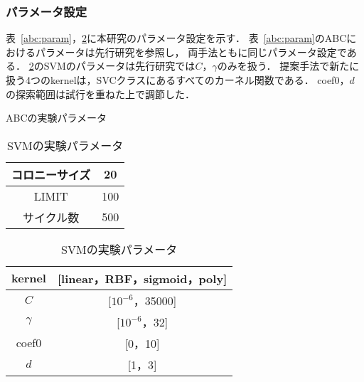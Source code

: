 \subsubsection{パラメータ設定}
表~\ref{abc:param}，\ref{svm:param}に本研究のパラメータ設定を示す．
表~\ref{abc:param}のABCにおけるパラメータは先行研究を参照し，
両手法ともに同じパラメータ設定である\cite{origin}．
\ref{svm:param}のSVMのパラメータは先行研究では$C$，$\gamma$のみを扱う．
提案手法で新たに扱う4つのkernelは，SVCクラスにあるすべてのカーネル関数である．
coef0，$d$の探索範囲は試行を重ねた上で調節した．
\begin{table}[tb]
    \centering
    \begin{minipage}{0.45\textwidth}  %
      \centering
      \caption{ABCの実験パラメータ}  %
      \begin{tabular}{|c|c|}  %
        \hline  %
        コロニーサイズ & 20 \\  %
        \hline  %
        LIMIT & 100 \\  %
        \hline  %
        サイクル数 & 500 \\  %
        \hline  %
      \end{tabular}
      \label{abc:param}  %
    \end{minipage}
    \begin{minipage}{0.45\textwidth}  %
      \centering
      \caption{SVMの実験パラメータ}  %
      \begin{tabular}{|c|c|}  %
        \hline  %
        kernel & [linear，RBF，sigmoid，poly] \\  %
        \hline  %
        $C$ & [$10^{-6}$，35000] \\  %
        \hline  %
        $\gamma$ & [$10^{-6}$，32] \\  %
        \hline  %
        coef0 & [0，10] \\  %
        \hline  %
        $d$ & [1，3] \\  %
        \hline  %
      \end{tabular}
      \label{svm:param}  %
    \end{minipage}
  \end{table}
